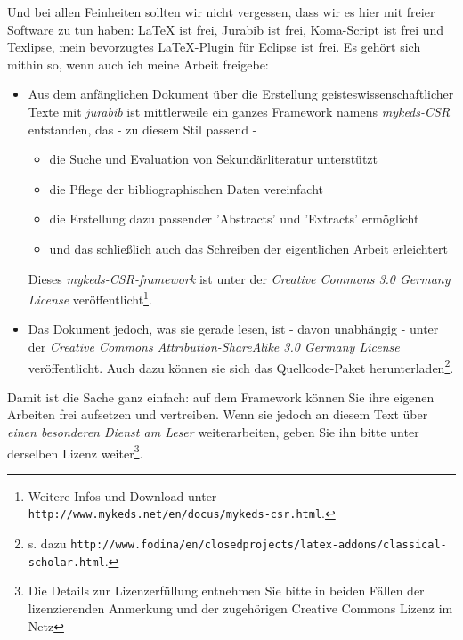 Und bei allen Feinheiten sollten wir nicht vergessen, dass wir es hier mit
freier Software zu tun haben: LaTeX ist frei, Jurabib ist frei, Koma-Script ist
frei und Texlipse, mein bevorzugtes LaTeX-Plugin für Eclipse ist frei. Es gehört
sich mithin so, wenn auch ich meine Arbeit freigebe: 

\begin{itemize}
  \item Aus dem anfänglichen Dokument über die Erstellung
  geisteswissenschaftlicher Texte mit \textit{jurabib} ist mittlerweile ein
  ganzes Framework namens \textit{mykeds-CSR} entstanden, das - zu diesem Stil
  passend -
  \begin{itemize}
    \item die Suche und Evaluation von Sekundärliteratur unterstützt
    \item die Pflege der bibliographischen Daten vereinfacht
    \item die Erstellung dazu passender 'Abstracts' und 'Extracts' ermöglicht
    \item und das schließlich auch das Schreiben der eigentlichen Arbeit
    erleichtert
  \end{itemize}
  Dieses \textit{mykeds-CSR-framework} ist unter der \textit{Creative Commons
  3.0 Germany License} veröffentlicht\footnote{Weitere Infos und Download unter
  \texttt{http://www.mykeds.net/en/docus/mykeds-csr.html}.}.
  \item Das Dokument jedoch, was sie gerade lesen, ist - davon unabhängig -
  unter der \textit{Creative Commons Attribution-ShareAlike 3.0 Germany License}
  veröffentlicht. Auch dazu können sie sich das Quellcode-Paket
  herunterladen\footnote{s. dazu
  \texttt{http://www.fodina/en/closedprojects/latex-addons/classical-scholar.html}.}.
\end{itemize}

Damit ist die Sache ganz einfach: auf dem Framework können Sie ihre eigenen
Arbeiten frei aufsetzen und vertreiben. Wenn sie jedoch an diesem Text über
\textit{einen besonderen Dienst am Leser} weiterarbeiten, geben Sie ihn bitte
unter derselben Lizenz weiter\footnote{Die Details zur Lizenzerfüllung entnehmen
Sie bitte in beiden Fällen der lizenzierenden Anmerkung und der zugehörigen
Creative Commons Lizenz im Netz}.

